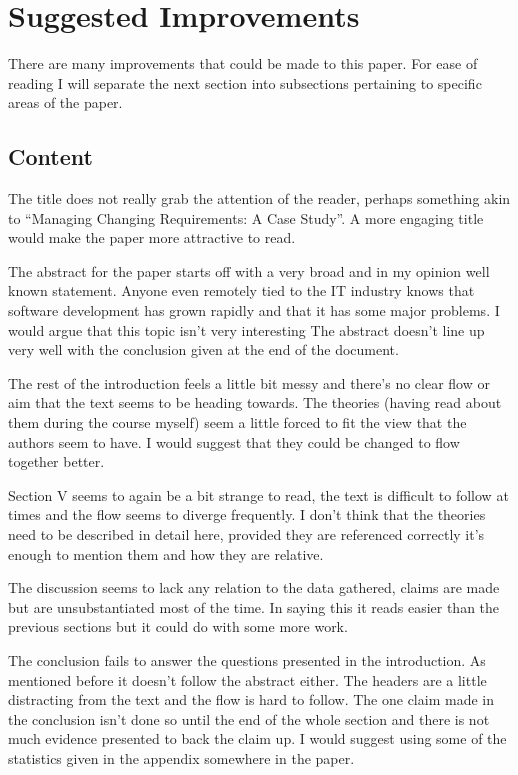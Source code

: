 \documentclass[conference]{IEEEtran}
\begin{document}
\section{Suggested Improvements}

There are many improvements that could be made to this paper. For ease of reading I will separate the next section into subsections pertaining to specific areas of the paper.

\subsection*{Content}

The title does not really grab the attention of the reader, perhaps something akin to ``Managing Changing Requirements: A Case Study''. A more engaging title would make the paper more attractive to read.

The abstract for the paper starts off with a very broad and in my opinion well known statement. Anyone even remotely tied to the IT industry knows that software development has grown rapidly and that it has some major problems. I would argue that this topic isn't very interesting The abstract doesn't line up very well with the conclusion given at the end of the document. 

The rest of the introduction feels a little bit messy and there's no clear flow or aim that the text seems to be heading towards. The theories (having read about them during the course myself) seem a little forced to fit the view that the authors seem to have. I would suggest that they could be changed to flow together better.

Section V seems to again be a bit strange to read, the text is difficult to follow at times and the flow seems to diverge frequently. I don't think that the theories need to be described in detail here, provided they are referenced correctly it's enough to mention them and how they are relative.

The discussion seems to lack any relation to the data gathered, claims are made but are unsubstantiated most of the time. In saying this it reads easier than the previous sections but it could do with some more work. 

The conclusion fails to answer the questions presented in the introduction. As mentioned before it doesn't follow the abstract either. The headers are a little distracting from the text and the flow is hard to follow. The one claim made in the conclusion isn't done so until the end of the whole section and there is not much evidence presented to back the claim up. I would suggest using some of the statistics given in the appendix somewhere in the paper.
\end{document}
